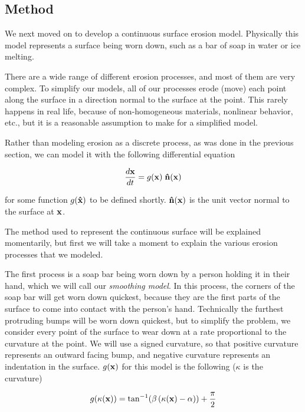 \subsection*{Method}

We next moved on to develop a continuous surface erosion model. Physically this model represents a surface being worn down, such as a bar of soap in water or ice melting. 

There are a wide range of different erosion processes, and most of them are very complex. To simplify our models, all of our processes erode (move) each point along the surface in a direction normal to the surface at the point. This rarely happens in real life, because of non-homogeneous materials, nonlinear behavior, etc., but it is a reasonable assumption to make for a simplified model.

Rather than modeling erosion as a discrete process, as was done in the previous section, we can model it with the following differential equation

\begin{equation}
\label{eq:erosion-diff-eq}
\frac{d\mathbf{x}}{dt} = g(\mathbf{x}) \; \mathbf{\hat{n}}(\mathbf{x})
\end{equation}

for some function $g(\mathbf{\hat{x}})$ to be defined shortly. $\mathbf{\hat{n}}(\mathbf{x})$ is the unit vector normal to the surface at $\mathbf{x}$.

The method used to represent the continuous surface will be explained momentarily, but first we will take a moment to explain the various erosion processes that we modeled.

The first process is a soap bar being worn down by a person holding it in their hand, which we will call our \textit{smoothing model}. In this process, the corners of the soap bar will get worn down quickest, because they are the first parts of the surface to come into contact with the person's hand. Technically the furthest protruding bumps will be worn down quickest, but to simplify the problem, we consider every point of the surface to wear down at a rate proportional to the curvature at the point. We will use a signed curvature, so that positive curvature represents an outward facing bump, and negative curvature represents an indentation in the surface. $g(\mathbf{x})$ for this model is the following ($\kappa$ is the curvature)

\begin{equation}
g(\kappa(\mathbf{x})) = \tan^{-1}(\beta \, (\kappa(\mathbf{x}) - \alpha)) + \frac{\pi}{2}
\end{equation}

